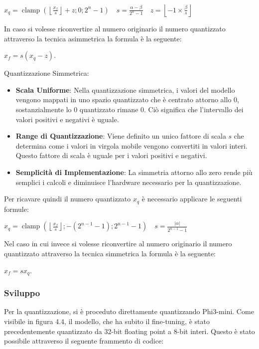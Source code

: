     \centerline{$x_q=\operatorname{clamp}\left(\left\lfloor\frac{x_f}{s}\right\rfloor+z ; 0 ; 2^n-1\right) \quad s=\frac{\alpha-\beta}{2^n-1} \quad z=\left\lfloor-1 \times \frac{\beta}{s}\right\rfloor$}
    
    In caso si volesse riconvertire al numero originario il numero quantizzato attraverso la tecnica asimmetrica la formula è la seguente:\\
    \centerline{$x_f = s(x_q-z)$.}
    Quantizzazione Simmetrica:
    \begin{itemize}
        \item \textbf{Scala Uniforme}: Nella quantizzazione simmetrica, i valori del modello vengono mappati in uno spazio quantizzato che è centrato attorno allo 0, sostanzialmente lo 0 quantizzato rimane 0. Ciò significa che l'intervallo dei valori positivi e negativi è uguale.
        \item \textbf{Range di Quantizzazione}: Viene definito un unico fattore di scala $s$ che determina come i valori in virgola mobile vengono convertiti in valori interi. Questo fattore di scala è uguale per i valori positivi e negativi.
        \item  \textbf{Semplicità di Implementazione}: La simmetria attorno allo zero rende più semplici i calcoli e diminuisce l'hardware necessario per la quantizzazione.
    \end{itemize}
    Per ricavare quindi il numero quantizzato $x_q$ è necessario applicare le seguenti formule:
    \centerline{$x_q=\operatorname{clamp}\left(\left\lfloor\frac{x_f}{s}\right\rfloor ;-\left(2^{n-1}-1\right) ; 2^{n-1}-1\right) \quad s=\frac{|\alpha|}{2^{n-1}-1}$}
    Nel caso in cui invece si volesse riconvertire al numero originario il numero quantizzato attraverso la tecnica simmetrica la formula è la seguente:\\
    \centerline{$x_f = sx_q$.}


    \subsubsection{Sviluppo}
    Per la quantizzazione, si è proceduto direttamente quantizzando Phi3-mini. Come visibile in figura 4.4, il modello, che ha subito il fine-tuning, è stato precedentemente quantizzato da 32-bit floating point a 8-bit interi. Questo è stato possibile attraverso il seguente frammento di codice:
    
